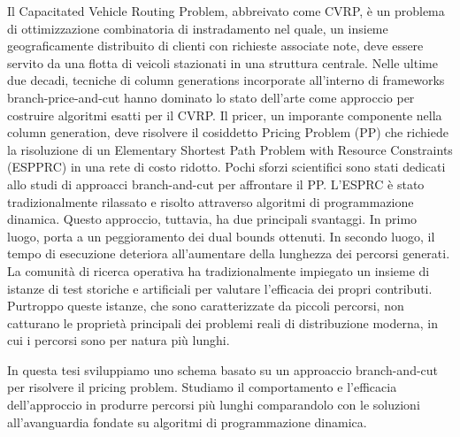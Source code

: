 \noindent Il Capacitated Vehicle Routing Problem, abbreivato come CVRP,
è un problema di ottimizzazione combinatoria di instradamento nel quale,
un insieme geograficamente distribuito di clienti con richieste associate note,
deve essere servito da una flotta di veicoli stazionati in una struttura centrale.
Nelle ultime due decadi,
tecniche di column generations incorporate all'interno di frameworks branch-price-and-cut
hanno dominato lo stato dell'arte come approccio
per costruire algoritmi esatti per il CVRP.
Il pricer, un imporante componente nella column generation, deve risolvere
il cosiddetto Pricing Problem (PP) che richiede la risoluzione di un
Elementary Shortest Path Problem with Resource Constraints (ESPPRC)
in una rete di costo ridotto.
Pochi sforzi scientifici sono stati dedicati allo studi di approacci
branch-and-cut per affrontare il PP.
L'ESPRC è stato tradizionalmente rilassato e risolto attraverso algoritmi di programmazione dinamica.
Questo approccio, tuttavia, ha due principali svantaggi.
In primo luogo, porta a un peggioramento dei dual bounds ottenuti.
In secondo luogo, il tempo di esecuzione deteriora all'aumentare della lunghezza dei percorsi generati.
La comunità di ricerca operativa ha tradizionalmente impiegato
un insieme di istanze di test storiche e artificiali per valutare
l'efficacia dei propri contributi.
Purtroppo queste istanze, che sono caratterizzate da piccoli percorsi,
non catturano le proprietà principali dei problemi reali di distribuzione moderna,
in cui i percorsi sono per natura più lunghi.

\noindent In questa tesi sviluppiamo
uno schema basato su un approaccio branch-and-cut per risolvere il pricing problem.
Studiamo il comportamento e l'efficacia dell'approccio in produrre percorsi più lunghi
comparandolo con le soluzioni all'avanguardia fondate su algoritmi di programmazione dinamica.

